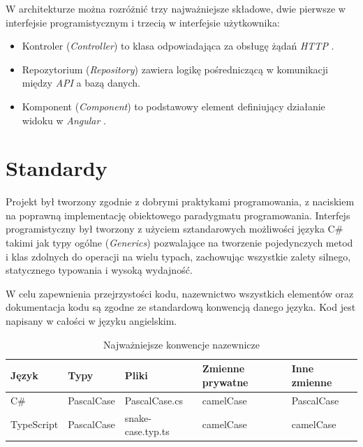 \documentclass[eng,printmode,openany]{mgr}
\begin{document}
W architekturze można rozróżnić trzy najważniejsze składowe, dwie pierwsze w interfejsie programistycznym i trzecią w interfejsie użytkownika:
\begin{itemize}
	\item Kontroler (\textit{Controller}) to klasa odpowiadająca za obsługę żądań \textit{HTTP} \cite{msdn-aspnet-api}.
	\item Repozytorium (\textit{Repository}) zawiera logikę pośredniczącą w komunikacji między \textit{API} a bazą danych.
	\item Komponent (\textit{Component}) to podstawowy element definiujący działanie widoku w \textit{Angular} \cite{angular-components}.
\end{itemize}

\section{Standardy}
Projekt był tworzony zgodnie z dobrymi praktykami programowania, z naciskiem na poprawną implementację obiektowego paradygmatu programowania. Interfejs programistyczny był tworzony z użyciem sztandarowych możliwości języka C\# takimi jak typy ogólne \cite{msdn-generics} (\textit{Generics}) pozwalające na tworzenie pojedynczych metod i klas zdolnych do operacji na wielu typach, zachowując wszystkie zalety silnego, statycznego typowania i wysoką wydajność.

W celu zapewnienia przejrzystości kodu, nazewnictwo wszystkich elementów oraz dokumentacja kodu są zgodne ze standardową konwencją danego języka. Kod jest napisany w całości w języku angielskim.
\begin{table}[H]
	\begin{tabularx}{\textwidth}{|l|l|l|l|l|}
		\hline
		Język      & Typy       			& Pliki                 & Zmienne prywatne & Inne zmienne \\ \hline
		C\# \cite{msdn-gnc}     & PascalCase & PascalCase.cs   		& camelCase        & PascalCase   \\ \hline
		TypeScript \cite{angular-sg} & PascalCase & snake-case.typ.ts 	& camelCase        & camelCase    \\ \hline
	\end{tabularx}
	\caption{Najważniejsze konwencje nazewnicze}
\end{table}
\end{document}
